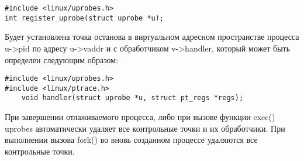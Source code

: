 \bigskip 
\begin{lstlisting}
#include <linux/uprobes.h>
int register_uprobe(struct uprobe *u); 
\end{lstlisting}

Будет установлена точка останова в виртуальном адресном пространстве 
процесса u->pid по адресу u->vaddr и с обработчиком v->handler, который
 может быть определен следующим образом: 

\begin{lstlisting}
#include <linux/uprobes.h>
#include <linux/ptrace.h>
	void handler(struct uprobe *u, struct pt_regs *regs);
\end{lstlisting}

\bigskip
При завершении отлаживаемого процесса, либо при вызове функции exec() 
uprobes автоматически удаляет все контрольные точки и их обработчики. 
При выполнении вызова fork() во вновь созданном процессе удаляются все 
контрольные точки. 


